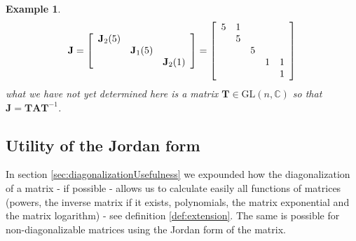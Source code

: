 \documentclass[a4paper,10pt,oneside]{book}
\newtheorem{example}{Example}
\begin{document}
\begin{example}
 \begin{equation}
  \mathbf{J}=
\left[ {\begin{array}{*{3}c}
         \mathbf{J}_2(5)\\
         & \mathbf{J}_1(5)\\
	&& \mathbf{J}_2(1)
        \end{array}}\right]=
\left[ {\begin{array}{*{5}c}
          5  & 1  \\
             & 5  \\
             &  &  5  \\
             &  &  &  1  & 1  \\
             &  &  &      & 1 
         \end{array}}\right]
 \end{equation}
what we have not yet determined here is a matrix $\mathbf{T}\in\text{GL}(n,\mathbb{C})$ so that $\mathbf{J}=\mathbf{TAT}^{-1}$.
\end{example}

\subsection{Utility of the Jordan form}
In section \ref{sec:diagonalizationUsefulness} we expounded how the diagonalization of a matrix - if possible - allows us to calculate easily all functions of matrices (powers, the inverse matrix if it exists, polynomials, the matrix exponential and the matrix logarithm) - see definition \ref{def:extension}. The same is possible for non-diagonalizable matrices using the Jordan form of the matrix.
\end{document}
